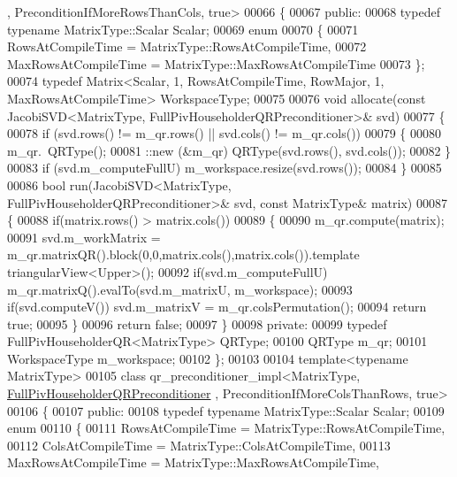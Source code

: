 \begin{DoxyCode}
      , PreconditionIfMoreRowsThanCols, true>
00066 \{
00067 \textcolor{keyword}{public}:
00068   \textcolor{keyword}{typedef} \textcolor{keyword}{typename} MatrixType::Scalar Scalar;
00069   \textcolor{keyword}{enum}
00070   \{
00071     RowsAtCompileTime = MatrixType::RowsAtCompileTime,
00072     MaxRowsAtCompileTime = MatrixType::MaxRowsAtCompileTime
00073   \};
00074   \textcolor{keyword}{typedef} Matrix<Scalar, 1, RowsAtCompileTime, RowMajor, 1, MaxRowsAtCompileTime> WorkspaceType;
00075 
00076   \textcolor{keywordtype}{void} allocate(\textcolor{keyword}{const} JacobiSVD<MatrixType, FullPivHouseholderQRPreconditioner>& svd)
00077   \{
00078     \textcolor{keywordflow}{if} (svd.rows() != m\_qr.rows() || svd.cols() != m\_qr.cols())
00079     \{
00080       m\_qr.~QRType();
00081       ::new (&m\_qr) QRType(svd.rows(), svd.cols());
00082     \}
00083     \textcolor{keywordflow}{if} (svd.m\_computeFullU) m\_workspace.resize(svd.rows());
00084   \}
00085 
00086   \textcolor{keywordtype}{bool} run(JacobiSVD<MatrixType, FullPivHouseholderQRPreconditioner>& svd, \textcolor{keyword}{const} MatrixType& matrix)
00087   \{
00088     \textcolor{keywordflow}{if}(matrix.rows() > matrix.cols())
00089     \{
00090       m\_qr.compute(matrix);
00091       svd.m\_workMatrix = m\_qr.matrixQR().block(0,0,matrix.cols(),matrix.cols()).\textcolor{keyword}{template} 
      triangularView<Upper>();
00092       \textcolor{keywordflow}{if}(svd.m\_computeFullU) m\_qr.matrixQ().evalTo(svd.m\_matrixU, m\_workspace);
00093       \textcolor{keywordflow}{if}(svd.computeV()) svd.m\_matrixV = m\_qr.colsPermutation();
00094       \textcolor{keywordflow}{return} \textcolor{keyword}{true};
00095     \}
00096     \textcolor{keywordflow}{return} \textcolor{keyword}{false};
00097   \}
00098 \textcolor{keyword}{private}:
00099   \textcolor{keyword}{typedef} FullPivHouseholderQR<MatrixType> QRType;
00100   QRType m\_qr;
00101   WorkspaceType m\_workspace;
00102 \};
00103 
00104 \textcolor{keyword}{template}<\textcolor{keyword}{typename} MatrixType>
00105 \textcolor{keyword}{class }qr\_preconditioner\_impl<MatrixType, \hyperlink{group__enums_gga46eba0d5c621f590b8cf1b53af31d56ea566c44ba828dea7f5d2fb174d799d5d2}{FullPivHouseholderQRPreconditioner}
      , PreconditionIfMoreColsThanRows, true>
00106 \{
00107 \textcolor{keyword}{public}:
00108   \textcolor{keyword}{typedef} \textcolor{keyword}{typename} MatrixType::Scalar Scalar;
00109   \textcolor{keyword}{enum}
00110   \{
00111     RowsAtCompileTime = MatrixType::RowsAtCompileTime,
00112     ColsAtCompileTime = MatrixType::ColsAtCompileTime,
00113     MaxRowsAtCompileTime = MatrixType::MaxRowsAtCompileTime,

\end{DoxyCode}
